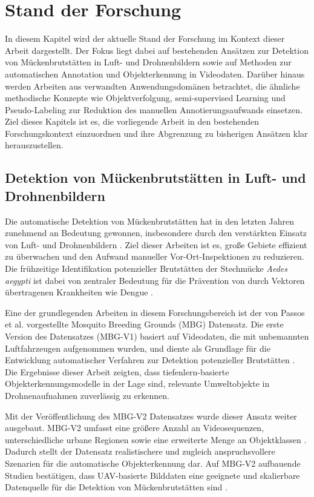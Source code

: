 \section{Stand der Forschung}

In diesem Kapitel wird der aktuelle Stand der Forschung im Kontext dieser Arbeit dargestellt. Der Fokus liegt dabei auf bestehenden Ansätzen zur Detektion von Mückenbrutstätten in Luft- und Drohnenbildern sowie auf Methoden zur automatischen Annotation und Objekterkennung in Videodaten. Darüber hinaus werden Arbeiten aus verwandten Anwendungsdomänen betrachtet, die ähnliche methodische Konzepte wie Objektverfolgung, semi-supervised Learning und Pseudo-Labeling zur Reduktion des manuellen Annotierungsaufwands einsetzen. Ziel dieses Kapitels ist es, die vorliegende Arbeit in den bestehenden Forschungskontext einzuordnen und ihre Abgrenzung zu bisherigen Ansätzen klar herauszustellen.



\subsection{Detektion von Mückenbrutstätten in Luft- und Drohnenbildern}

Die automatische Detektion von Mückenbrutstätten hat in den letzten Jahren zunehmend an
Bedeutung gewonnen, insbesondere durch den verstärkten Einsatz von Luft- und
Drohnenbildern \cite{mahfodz2019review}. Ziel dieser Arbeiten ist es, große Gebiete effizient zu überwachen und den Aufwand manueller Vor-Ort-Inspektionen zu reduzieren. Die frühzeitige Identifikation potenzieller Brutstätten der Stechmücke \textit{Aedes aegypti} ist dabei von zentraler Bedeutung für die Prävention von durch Vektoren übertragenen Krankheiten wie Dengue \cite{knoblauch2023breeding}.

Eine der grundlegenden Arbeiten in diesem Forschungsbereich ist der von Passos et al.
vorgestellte Mosquito Breeding Grounds (MBG) Datensatz. Die erste Version des Datensatzes (MBG-V1) basiert auf Videodaten, die mit unbemannten Luftfahrzeugen aufgenommen wurden, und diente als Grundlage für die Entwicklung automatischer Verfahren zur Detektion potenzieller Brutstätten \cite{passos2020mbgv1}. Die Ergebnisse dieser Arbeit zeigten, dass tiefenlern-basierte Objekterkennungsmodelle in der Lage sind, relevante Umweltobjekte in Drohnenaufnahmen zuverlässig zu erkennen.

Mit der Veröffentlichung des MBG-V2 Datensatzes wurde dieser Ansatz weiter ausgebaut.
MBG-V2 umfasst eine größere Anzahl an Videosequenzen, unterschiedliche urbane Regionen
sowie eine erweiterte Menge an Objektklassen \cite{passos2024mbgv2}. Dadurch stellt der
Datensatz realistischere und zugleich anspruchsvollere Szenarien für die automatische
Objekterkennung dar. Auf MBG-V2 aufbauende Studien bestätigen, dass UAV-basierte Bilddaten eine geeignete und skalierbare Datenquelle für die Detektion von Mückenbrutstätten sind \cite{passos2023augmented}.

